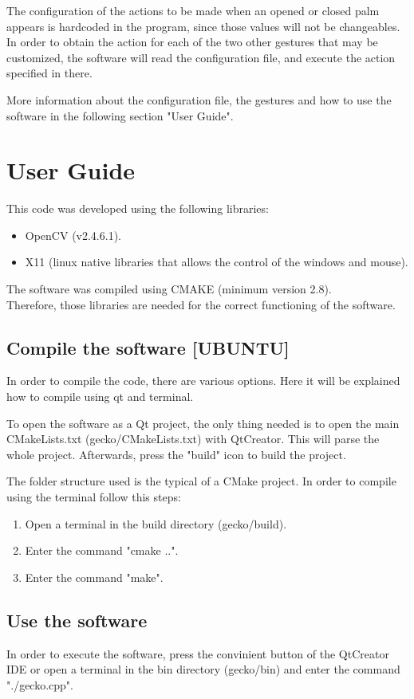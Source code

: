 \documentclass{article}
\begin{document}
The configuration of the actions to be made when an opened or closed palm appears is hardcoded in the program, since those values will not be changeables. In order to obtain the action for each of the two other gestures that may be customized, the software will read the configuration file, and execute the action specified in there. 

More information about the configuration file, the gestures and how to use the software in the following section "User Guide". 

\section{User Guide}
This code was developed using the following libraries: 
\begin{itemize}
\item OpenCV (v2.4.6.1).
\item X11 (linux native libraries that allows the control of the windows and mouse). 
\end{itemize}
The software was compiled using CMAKE (minimum version 2.8).
\\[0.5cm]
Therefore, those libraries are needed for the correct functioning of the software. 


\subsection{Compile the software [UBUNTU]}

In order to compile the code, there are various options. Here it will be explained how to compile using qt and terminal. 

To open the software as a Qt project, the only thing needed is to open the main CMakeLists.txt (gecko/CMakeLists.txt) with QtCreator. This will parse the whole project. 
Afterwards, press the "build" icon to build the project. 


The folder structure used is the typical of a CMake project. In order to compile using the terminal follow this steps: 
\begin{enumerate}
 \item Open a terminal in the build directory (gecko/build). 
 \item Enter the command "cmake ..". 
 \item Enter the command "make". 
\end{enumerate}

\subsection{Use the software}
In order to execute the software, press the convinient button of the QtCreator IDE or open a terminal in the bin directory (gecko/bin) and enter the command "./gecko.cpp". 
\end{document}
